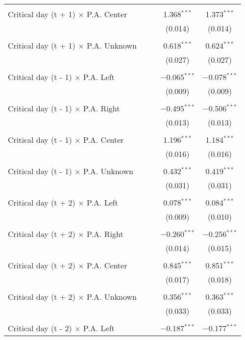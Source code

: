 \documentclass[
]{article}
\begin{document}
\begin{table}[!htbp]
{\begin{tabular}{@{\extracolsep{5pt}}lcccc}
  & & & & \\ 
 Critical day (t + 1) $\times$ P.A. Center &  &  & 1.368$^{***}$ & 1.373$^{***}$ \\ 
  &  &  & (0.014) & (0.014) \\ 
  & & & & \\ 
 Critical day (t + 1) $\times$ P.A. Unknown &  &  & 0.618$^{***}$ & 0.624$^{***}$ \\ 
  &  &  & (0.027) & (0.027) \\ 
  & & & & \\ 
 Critical day (t - 1) $\times$ P.A. Left &  &  & $-$0.065$^{***}$ & $-$0.078$^{***}$ \\ 
  &  &  & (0.009) & (0.009) \\ 
  & & & & \\ 
 Critical day (t - 1) $\times$ P.A. Right &  &  & $-$0.495$^{***}$ & $-$0.506$^{***}$ \\ 
  &  &  & (0.013) & (0.013) \\ 
  & & & & \\ 
 Critical day (t - 1) $\times$ P.A. Center &  &  & 1.196$^{***}$ & 1.184$^{***}$ \\ 
  &  &  & (0.016) & (0.016) \\ 
  & & & & \\ 
 Critical day (t - 1) $\times$ P.A. Unknown &  &  & 0.432$^{***}$ & 0.419$^{***}$ \\ 
  &  &  & (0.031) & (0.031) \\ 
  & & & & \\ 
 Critical day (t + 2) $\times$ P.A. Left &  &  & 0.078$^{***}$ & 0.084$^{***}$ \\ 
  &  &  & (0.009) & (0.010) \\ 
  & & & & \\ 
 Critical day (t + 2) $\times$ P.A. Right &  &  & $-$0.260$^{***}$ & $-$0.256$^{***}$ \\ 
  &  &  & (0.014) & (0.015) \\ 
  & & & & \\ 
 Critical day (t + 2) $\times$ P.A. Center &  &  & 0.845$^{***}$ & 0.851$^{***}$ \\ 
  &  &  & (0.017) & (0.018) \\ 
  & & & & \\ 
 Critical day (t + 2) $\times$ P.A. Unknown &  &  & 0.356$^{***}$ & 0.363$^{***}$ \\ 
  &  &  & (0.033) & (0.033) \\ 
  & & & & \\ 
 Critical day (t - 2) $\times$ P.A. Left &  &  & $-$0.187$^{***}$ & $-$0.177$^{***}$ \\ 

\end{tabular}}
\end{table}
\end{document}
